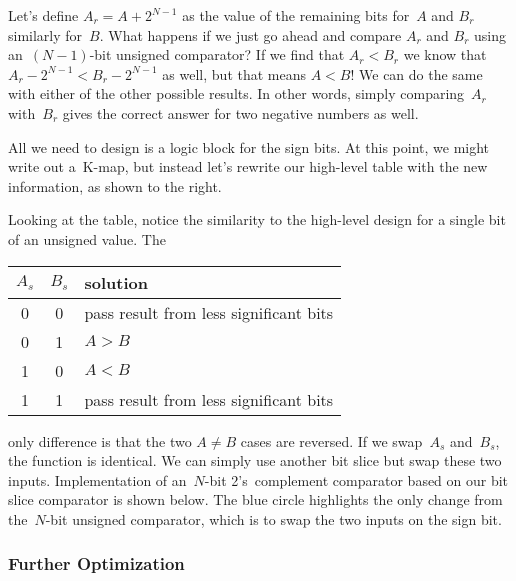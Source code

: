 Let's define $A_r=A+2^{N-1}$ as the value of the 
remaining bits for~$A$ and $B_r$ similarly for~$B$.
%
What happens if we just go ahead and compare $A_r$ and $B_r$ using 
an~\mbox{$(N-1)$-bit} unsigned comparator?
%
If we find that $A_r<B_r$ we know that $A_r-2^{N-1}<B_r-2^{N-1}$ as well, 
but that means $A<B$!  We can do the same with either of the other
possible results.  In other words, simply comparing~$A_r$ with~$B_r$
gives the correct answer for two negative numbers as well.

\begin{minipage}{3.28in}
All we need to design is a logic block for the sign bits.  At this point,
we might write out a~\mbox{K-map}, but instead let's rewrite our
high-level table with the new information, as shown to the right.\mpline

Looking at the table, notice the similarity 
to the high-level design for a single bit of an unsigned value.  The\linebreak
\end{minipage}\hspace{.25in}%
\begin{minipage}{2.97in}
\begin{tabular}{cc|l}
$A_s$& $B_s$& solution\\ \hline
0& 0& pass result from less significant bits\\
0& 1& $A>B$\\
1& 0& $A<B$\\
1& 1& pass result from less significant bits
\end{tabular}\vspace{12pt}
\end{minipage}\mpdone

only difference is that the two $A\not=B$ cases are reversed.  If we
swap~$A_s$ and~$B_s$, the function is identical.  We can simply use
another bit slice but swap these two inputs.
%
Implementation of an~\mbox{$N$-bit} 2's~complement comparator based
on our bit slice comparator is shown below.  The blue circle highlights
the only change from the~\mbox{$N$-bit} unsigned comparator, which is
to swap the two inputs on the sign bit.\\

\centerline{}\vspace{24pt}

\pagebreak

\subsubsection{Further Optimization}

